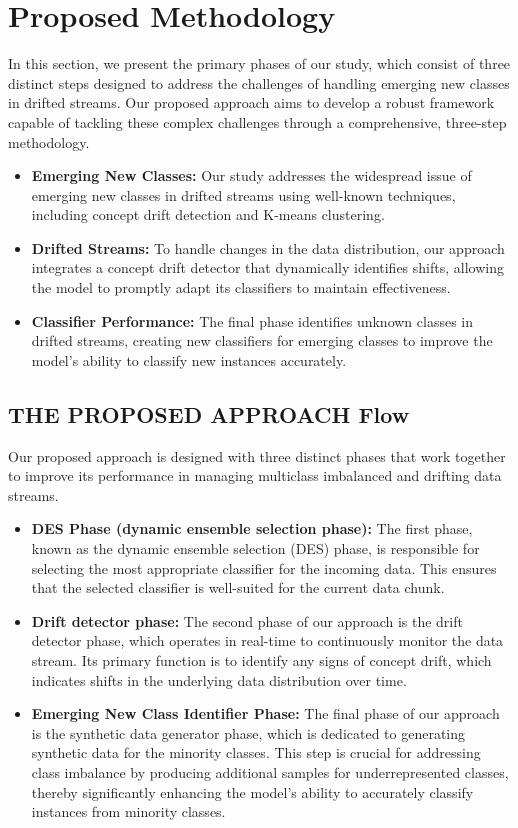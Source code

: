 
\section{Proposed Methodology}\label{sec:5_first_proposed_approach}

In this section, we present the primary phases of our study, which consist of three distinct steps designed to address the challenges of handling emerging new classes in drifted streams. Our proposed approach aims to develop a robust framework capable of tackling these complex challenges through a comprehensive, three-step methodology.
\begin{itemize}
	\item \textbf{Emerging New Classes:} Our study addresses the widespread issue of emerging new classes in drifted streams using well-known techniques, including concept drift detection and K-means clustering.
	\item \textbf{Drifted Streams: } To handle changes in the data distribution, our approach integrates a concept drift detector that dynamically identifies shifts, allowing the model to promptly adapt its classifiers to maintain effectiveness.
	\item \textbf{Classifier Performance:} The final phase identifies unknown classes in drifted streams, creating new classifiers for emerging classes to improve the model's ability to classify new instances accurately.
\end{itemize}

\subsection{THE PROPOSED APPROACH Flow}

Our proposed approach is designed with three distinct phases that work together to improve its performance in managing multiclass imbalanced and drifting data streams. 
\begin{itemize}
	\item \textbf{DES Phase (dynamic ensemble selection phase):} The first phase, known as the dynamic ensemble selection (DES) phase, is responsible for selecting the most appropriate classifier for the incoming data. This ensures that the selected classifier is well-suited for the current data chunk.
	\item \textbf{Drift detector phase:} The second phase of our approach is the drift detector phase, which operates in real-time to continuously monitor the data stream. Its primary function is to identify any signs of concept drift, which indicates shifts in the underlying data distribution over time.
	\item \textbf{Emerging New Class Identifier Phase:} The final phase of our approach is the synthetic data generator phase, which is dedicated to generating synthetic data for the minority classes. This step is crucial for addressing class imbalance by producing additional samples for underrepresented classes, thereby significantly enhancing the model's ability to accurately classify instances from minority classes.
\end{itemize}

